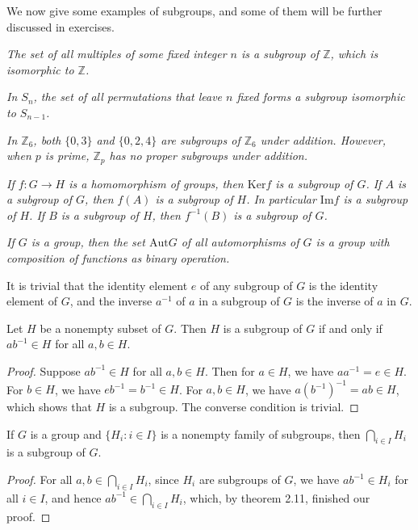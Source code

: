We now give some examples of subgroups, and some of them will be further discussed in exercises.
\begin{example}\em
The set of all multiples of some fixed integer $n$ is a subgroup of $\mathbb{Z}$, which is isomorphic to $\mathbb{Z}$.
\end{example}
\begin{example}\em
In $S_n$, the set of all permutations that leave $n$ fixed forms a subgroup isomorphic to $S_{n-1}$.
\end{example}
\begin{example}\em
In $\mathbb{Z}_6$, both $\{0,3\}$ and $\{0,2,4\}$ are subgroups of $\mathbb{Z}_6$ under addition. However, when $p$ is prime, $\mathbb{Z}_p$ has no proper subgroups under addition.
\end{example}
\begin{example}\em
If $f:G\to H$ is a homomorphism of groups, then $\mathrm{Ker}f$ is a subgroup of $G$. If $A$ is a subgroup of $G$, then $f(A)$ is a subgroup of $H$. In particular $\mathrm{Im}f$ is a subgroup of $H$. If $B$ is a subgroup of $H$, then $f^{-1}(B)$ is a subgroup of $G$. 
\end{example}
\begin{example}\em
If $G$ is a group, then the set $\mathrm{Aut}G$ of all automorphisms of $G$ is a group with composition of functions as binary operation.
\end{example}
It is trivial that the identity element $e$ of any subgroup of $G$ is the identity element of $G$, and the inverse $a^{-1}$ of $a$ in a subgroup of $G$ is the inverse of $a$ in $G$.
\begin{theorem}
Let $H$ be a nonempty subset of $G$. Then $H$ is a subgroup of $G$ if and only if $ab^{-1}\in H$ for all $a,b\in H$.
\end{theorem}
\begin{proof}
Suppose $ab^{-1}\in H$ for all $a,b\in H$. Then for $a\in H$, we have $aa^{-1}=e\in H$. For $b\in H$, we have $eb^{-1}=b^{-1}\in H$. For $a,b\in H$, we have $a(b^{-1})^{-1}=ab\in H$, which shows that $H$ is a subgroup. The converse condition is trivial.
\end{proof}
\begin{corollary}
If $G$ is a group and $\{H_i:i\in I\}$ is a nonempty family of subgroups, then $\bigcap_{i\in I}H_i$ is a subgroup of $G$.
\end{corollary}
\begin{proof}
For all $a,b\in\bigcap_{i\in I}H_i$, since $H_i$ are subgroups of $G$, we have $ab^{-1}\in H_i$ for all $i\in I$, and hence $ab^{-1}\in\bigcap_{i\in I}H_i$, which, by theorem 2.11, finished our proof.
\end{proof}
